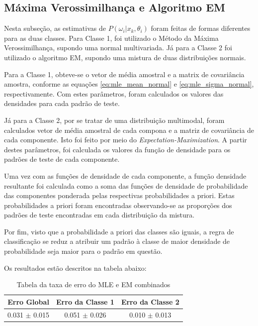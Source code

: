 \subsection{Máxima Verossimilhança e Algoritmo EM}
\label{subsec:exp-mle-em}

Nesta subseção, as estimativas de $P(\omega_i | x_k, \theta_i)$ foram feitas de formas diferentes para as duas classes. Para Classe 1, foi utilizado o Método da Máxima Verossimilhança, supondo uma normal multivariada. Já para a Classe 2 foi utilizado o algoritmo EM, supondo uma mistura de duas distribuições normais.

Para a Classe 1, obteve-se o vetor de média amostral e a matrix de covariância amostra, conforme as equações \ref{eq:mle_mean_normal} e \ref{eq:mle_sigma_normal}, respectivamente. Com estes parâmetros, foram calculados os valores das densidades para cada padrão de teste.

Já para a Classe 2, por se tratar de uma distribuição multimodal, foram calculados vetor de média amostral de cada compona e a matriz de covariância de cada componente. Isto foi feito por meio do \textit{Expectation-Maximization}. A partir destes parâmetros, foi calculada os valores da função de densidade para os padrões de teste de cada componente.

Uma vez com as funções de densidade de cada componente, a função densidade resultante foi calculada como a soma das funções de densidade de probabilidade das componentes ponderada pelas respectivas probabilidades a priori. Estas probabilidades a priori foram encontradas observando-se as proporções dos padrões de teste encontradas em cada distribuição da mistura.

Por fim, visto que a probabilidade a priori das classes são iguais, a regra de classificação se reduz a atribuir um padrão à classe de maior densidade de probabilidade seja maior para o padrão em questão.

Os resultados estão descritos na tabela abaixo:

\begin{table}[H]
\begin{center}
\begin{tabular}{|c|c|c|}
\hline
Erro Global			&	Erro da Classe 1	&	Erro da Classe 2	\\
\hline %
0.031 $\pm$ 0.015	&	0.051 $\pm$ 0.026	&	0.010 $\pm$ 0.013	\\
\hline
\end{tabular}%
\end{center}   %
\caption{Tabela da taxa de erro do MLE e EM combinados}
\label{tab:erro-mle-em}
\end{table}

